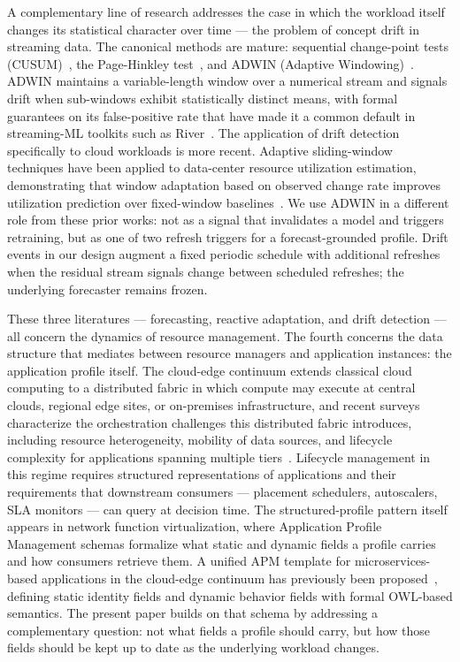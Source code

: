 \documentclass[manuscript,screen,review,anonymous]{acmart}
\begin{document}
A complementary line of research addresses the case in which
the workload itself changes its statistical character over
time --- the problem of concept drift in streaming data. The
canonical methods are mature: sequential change-point tests
(CUSUM)~\cite{page_cusum_1954}, the Page-Hinkley
test~\cite{hinkley_changepoint_1971}, and ADWIN (Adaptive
Windowing)~\cite{bifet_adwin_2007}. ADWIN maintains a
variable-length window over a numerical stream and signals
drift when sub-windows exhibit statistically distinct means,
with formal guarantees on its false-positive rate that have
made it a common default in streaming-ML toolkits such as
River~\cite{montiel_river_2021}. The application of drift
detection specifically to cloud workloads is more recent.
Adaptive sliding-window techniques have been applied to
data-center resource utilization estimation, demonstrating
that window adaptation based on observed change rate improves
utilization prediction over fixed-window
baselines~\cite{baig_adaptive_windows_2019}. We use ADWIN in
a different role from these prior works: not as a signal that
invalidates a model and triggers retraining, but as one of two
refresh triggers for a forecast-grounded profile. Drift events
in our design augment a fixed periodic schedule with
additional refreshes when the residual stream signals change
between scheduled refreshes; the underlying forecaster remains
frozen.

These three literatures --- forecasting, reactive adaptation,
and drift detection --- all concern the dynamics of resource
management. The fourth concerns the data structure that
mediates between resource managers and application instances:
the application profile itself. The cloud-edge continuum
extends classical cloud computing to a distributed fabric in
which compute may execute at central clouds, regional edge
sites, or on-premises infrastructure, and recent surveys
characterize the orchestration challenges this distributed
fabric introduces, including resource heterogeneity, mobility
of data sources, and lifecycle complexity for applications
spanning multiple tiers~\cite{ullah_cecc_survey_2023}.
Lifecycle management in this regime requires structured
representations of applications and their requirements that
downstream consumers --- placement schedulers, autoscalers,
SLA monitors --- can query at decision time. The
structured-profile pattern itself appears in network function
virtualization, where Application Profile Management schemas
formalize what static and dynamic fields a profile carries and
how consumers retrieve them. A unified APM template for
microservices-based applications in the cloud-edge continuum
has previously been proposed~\cite{nfv_sdn_apm}, defining
static identity fields and dynamic behavior fields with formal
OWL-based semantics. The present paper builds on that schema
by addressing a complementary question: not what fields a
profile should carry, but how those fields should be kept up
to date as the underlying workload changes.
\end{document}
